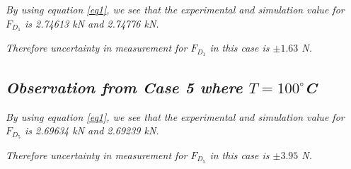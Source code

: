 	\textit{By using equation \ref{eq1}, we see that the experimental and simulation value for $F_{D_1}$ is 2.74613 kN and 2.74776 kN.}
        
	\textit{Therefore uncertainty in measurement for $F_{D_1}$ in this case is $\pm{\textit{1.63}}$ N.}
        
        
\subsection{\textit{Observation from Case 5 where $T = 100^\circ$C}}
        
	\textit{By using equation \ref{eq1}, we see that the experimental and simulation value for $F_{D_5}$ is 2.69634 kN and 2.69239 kN.}
        
	\textit{Therefore uncertainty in measurement for $F_{D_5}$ in this case is $\pm{\textit{3.95}}$ N.}
        

        

        




